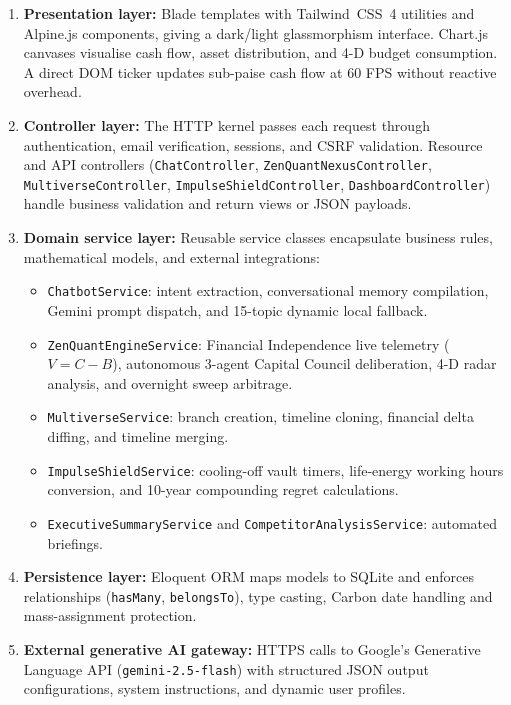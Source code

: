 \documentclass[12pt,a4paper]{report}
\newcommand{\TW}{Tailwind~CSS~4}
\begin{document}
\begin{enumerate}[label=\arabic*.,leftmargin=*,itemsep=6pt]
\item \textbf{Presentation layer:}
Blade templates with \TW{} utilities and Alpine.js components, giving a dark/light glassmorphism interface. Chart.js canvases visualise cash flow, asset distribution, and 4-D budget consumption. A direct DOM ticker updates sub-paise cash flow at 60 FPS without reactive overhead.

\item \textbf{Controller layer:}
The HTTP kernel passes each request through authentication, email verification, sessions, and CSRF validation. Resource and API controllers (\texttt{ChatController}, \texttt{ZenQuantNexusController}, \texttt{MultiverseController}, \texttt{ImpulseShieldController}, \texttt{DashboardController}) handle business validation and return views or JSON payloads.

\item \textbf{Domain service layer:}
Reusable service classes encapsulate business rules, mathematical models, and external integrations:
\begin{itemize}[leftmargin=*]
    \item \texttt{ChatbotService}: intent extraction, conversational memory compilation, Gemini prompt dispatch, and 15-topic dynamic local fallback.
    \item \texttt{ZenQuantEngineService}: Financial Independence live telemetry ($V = C - B$), autonomous 3-agent Capital Council deliberation, 4-D radar analysis, and overnight sweep arbitrage.
    \item \texttt{MultiverseService}: branch creation, timeline cloning, financial delta diffing, and timeline merging.
    \item \texttt{ImpulseShieldService}: cooling-off vault timers, life-energy working hours conversion, and 10-year compounding regret calculations.
    \item \texttt{ExecutiveSummaryService} and \texttt{CompetitorAnalysisService}: automated briefings.
\end{itemize}

\item \textbf{Persistence layer:}
Eloquent ORM maps models to SQLite and enforces relationships (\texttt{hasMany}, \texttt{belongsTo}), type casting, Carbon date handling and mass-assignment protection.

\item \textbf{External generative AI gateway:}
HTTPS calls to Google's Generative Language API (\texttt{gemini-2.5-flash}) with structured JSON output configurations, system instructions, and dynamic user profiles.
\end{enumerate}
\end{document}
